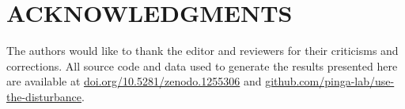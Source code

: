 \documentclass[manuscript]{geophysics}
\begin{document}


\section{ACKNOWLEDGMENTS}

The authors would like to thank the editor and reviewers for their criticisms
and corrections. All source code and data used to generate the results presented 
here are available at
\href{https://doi.org/10.5281/zenodo.1255306}{doi.org/10.5281/zenodo.1255306}
and
\href{https://github.com/pinga-lab/use-the-disturbance}{github.com/pinga-lab/use-the-disturbance}.




 
\end{document}

